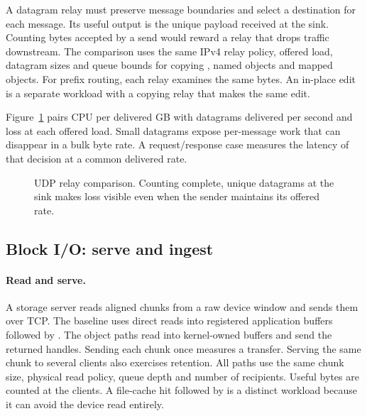 A datagram relay must preserve message boundaries and select a destination for
each message. Its useful output is the unique payload received at the sink.
Counting bytes accepted by a send would reward a relay that drops traffic
downstream. The comparison uses the same IPv4 relay policy, offered load,
datagram sizes and queue bounds for copying \iouring, named objects and mapped
objects. For prefix routing, each relay examines the same bytes. An in-place
edit is a separate workload with a copying relay that makes the same edit.

Figure~\ref{fig:udp} pairs CPU per delivered GB with datagrams delivered per
second and loss at each offered load. Small datagrams expose per-message work
that can disappear in a bulk byte rate. A request/response case measures the
latency of that decision at a common delivered rate.
\begin{figure}[t]
\centering
{}
\caption{UDP relay comparison. Counting complete, unique datagrams at the sink
makes loss visible even when the sender maintains its offered rate.}
\label{fig:udp}
\end{figure}

\subsection{Block I/O: serve and ingest}
\label{sec:eval:block}

\paragraph{Read and serve.} A storage server reads aligned chunks from a raw
device window and sends them over TCP. The baseline uses direct reads into
registered application buffers followed by \sendzc. The object paths read
into kernel-owned buffers and send the returned handles. Sending each chunk
once measures a transfer. Serving the same chunk to several clients also
exercises retention. All paths use the same chunk size, physical read policy,
queue depth and number of recipients. Useful bytes are counted at the clients.
A file-cache hit followed by \sendfile is a distinct workload because it can
avoid the device read entirely.

